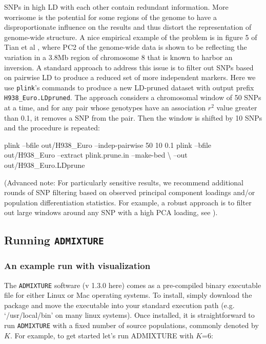\documentclass{svmult}       %
\newenvironment{Shaded}{\begin{snugshade}}{\end{snugshade}}
\newcommand{\ExtensionTok}[1]{#1}
\newcommand{\NormalTok}[1]{#1}
\begin{document}
SNPs in high LD with each other contain redundant information. More
worrisome is the potential for some regions of the genome to have a
disproportionate influence on the results and thus distort the
representation of genome-wide structure. A nice empirical example of the
problem is in figure 5 of Tian et al \cite{Tian2008aa}, where PC2 of
the genome-wide data is shown to be reflecting the variation in a 3.8Mb
region of chromosome 8 that is known to harbor an inversion. A standard
approach to address this issue is to filter out SNPs based on pairwise
LD to produce a reduced set of more independent markers. Here we use
\texttt{plink}'s commands to produce a new LD-pruned dataset with output
prefix \texttt{H938\_Euro.LDpruned}. The approach considers a
chromosomal window of 50 SNPs at a time, and for any pair whose
genotypes have an association \(r^2\) value greater than 0.1, it removes
a SNP from the pair. Then the window is shifted by 10 SNPs and the
procedure is repeated:

\begin{Shaded}
\begin{Highlighting}[]
\ExtensionTok{plink}\NormalTok{ --bfile out/H938_Euro --indep-pairwise 50 10 0.1}
\ExtensionTok{plink}\NormalTok{ --bfile out/H938_Euro --extract plink.prune.in --make-bed \textbackslash{}}
\NormalTok{--out out/H938_Euro.LDprune}
\end{Highlighting}
\end{Shaded}

(Advanced note: For particularly sensitive results, we recommend
additional rounds of SNP filtering based on observed principal component
loadings and/or population differentiation statistics. For example, a
robust approach is to filter out large windows around any SNP with a
high PCA loading, see \cite{Novembre08b}).

\subsection{\texorpdfstring{Running
\texttt{ADMIXTURE}}{Running ADMIXTURE}}\label{running-admixture}

\subsubsection{An example run with
visualization}\label{an-example-run-with-visualization}

The \texttt{ADMIXTURE} software (v 1.3.0 here) comes as a pre-compiled
binary executable file for either Linux or Mac operating systems. To
install, simply download the package and move the executable into your
standard execution path (e.g. `/usr/local/bin' on many linux systems).
Once installed, it is straightforward to run \texttt{ADMIXTURE} with a
fixed number of source populations, commonly denoted by \(K\). For
example, to get started let's run ADMIXTURE with \(K\)=6:
\end{document}

